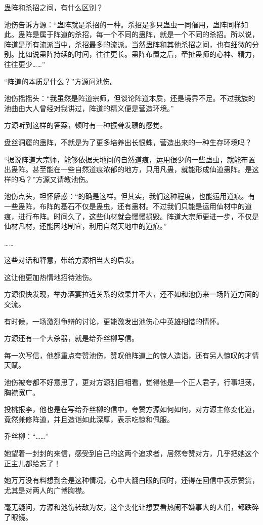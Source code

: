 \begin{this_body}
蛊阵和杀招之间，有什么区别？

池伤告诉方源：“蛊阵就是杀招的一种。杀招是多只蛊虫一同催用，蛊阵同样如此。蛊阵是属于阵道的杀招，每一个不同的蛊阵，就是一个不同的杀招。所以说，阵道是所有流派当中，杀招最多的流派。当然蛊阵和其他杀招之间，也有细微的分别。比如说蛊阵持续的时间，往往更长。蛊阵布置之后，牵扯蛊师的心神、精力，往往更少……”

“阵道的本质是什么？”方源问池伤。

池伤摇摇头：“我虽然是阵道宗师，但谈论阵道本质，还是境界不足。不过我族的池曲由大人曾经对我讲过，阵道的精义便是营造环境。”

方源听到这样的答案，顿时有一种振聋发聩的感觉。

盘丝洞窟的蛊阵，不就是为了更多培养出长恨蛛，营造出来的一种生存环境吗？

“据说阵道大宗师，能够依据天地间的自然道痕，运用很少的一些蛊虫，就能布置出蛊阵。甚至能在一些自然道痕浓郁的地方，只用凡蛊，就能形成仙道蛊阵。是这样的吗？”方源又请教池伤。

池伤点头，坦怀解惑：“的确是这样。但其实，我们这种程度，也能运用道痕。有一些蛊阵，布阵的基石不仅是蛊虫，还有蛊材。不过我们只能是运用仙材中的道痕，进行布阵。时间久了，这些仙材就会慢慢损毁。阵道大宗师更进一步，不仅是仙材凡材，还能因地制宜，利用自然天地中的道痕。”

……

这些对话和释意，带给方源相当大的启发。

这让他更加热情地招待池伤。

方源很快发现，举办酒宴拉近关系的效果并不大，还不如和池伤来一场阵道方面的交流。

有时候，一场激烈争辩的讨论，更能激发出池伤心中英雄相惜的情怀。

方源还有一个大杀器，就是给乔丝柳写信。

每一次写信，他都重点夸赞池伤，赞叹他阵道上的惊人造诣，还有另人惊叹的才情天赋。

池伤被夸都不好意思了，更对方源刮目相看，觉得他是一个正人君子，行事坦荡，胸襟宽广。

投桃报李，他也是在写给乔丝柳的信中，夸赞方源如何如何，对方源主修变化道，竟然兼修阵道，并且造诣如此深厚，表示吃惊和佩服。

乔丝柳：“……”

她望着一封封的来信，感受到自己的这两个追求者，居然夸赞对方，几乎把她这个正主儿都给忘了！

她万万没有料想到会是这种情况，心中大翻白眼的同时，还得在回信中表示赞赏，尤其是对两人的广博胸襟。

毫无疑问，方源和池伤转敌为友，这个变化让想要看热闹不嫌事大的人们，都跌碎了眼镜。


\end{this_body}
